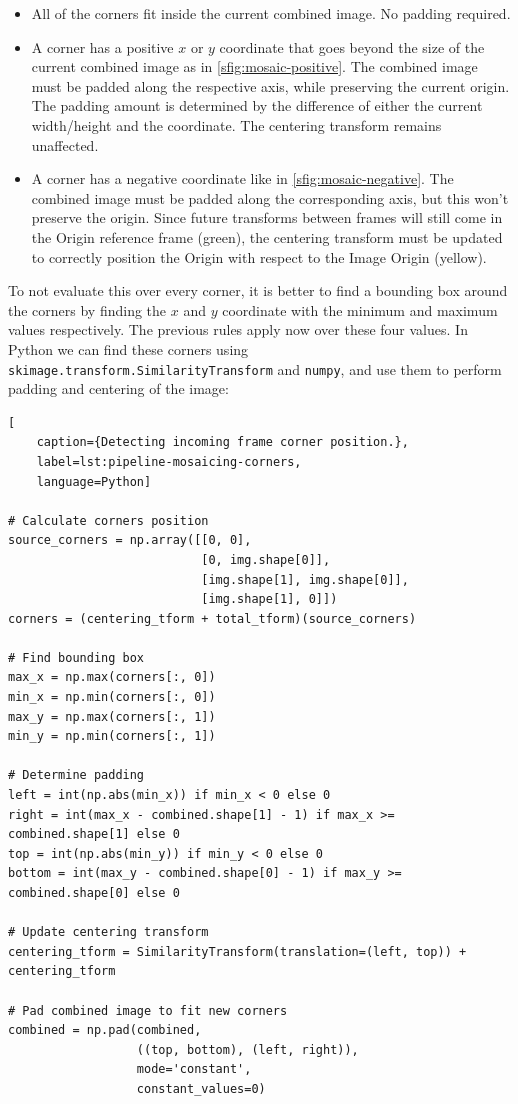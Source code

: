 \begin{itemize}
    \item All of the corners fit inside the current combined image. No padding required.
    \item A corner has a positive \(x\) or \(y\) coordinate that goes beyond the size of the current combined image as in \autoref{sfig:mosaic-positive}. The combined image must be padded along the respective axis, while preserving the current origin. The padding amount is determined by the difference of either the current width/height and the coordinate. The centering transform remains unaffected.
    \item A corner has a negative coordinate like in \autoref{sfig:mosaic-negative}. The combined image must be padded along the corresponding axis, but this won't preserve the origin. Since future transforms between frames will still come in the Origin reference frame (green), the centering transform must be updated to correctly position the Origin with respect to the Image Origin (yellow).
\end{itemize}

To not evaluate this over every corner, it is better to find a bounding box around the corners by finding the \(x\) and \(y\) coordinate with the minimum and maximum values respectively. The previous rules apply now over these four values. In Python we can find these corners using \texttt{skimage.transform.SimilarityTransform} and \texttt{numpy}, and use them to perform padding and centering of the image:

\begin{lstlisting}[
    caption={Detecting incoming frame corner position.},
    label=lst:pipeline-mosaicing-corners,
    language=Python]

# Calculate corners position
source_corners = np.array([[0, 0], 
                           [0, img.shape[0]], 
                           [img.shape[1], img.shape[0]], 
                           [img.shape[1], 0]])
corners = (centering_tform + total_tform)(source_corners)

# Find bounding box
max_x = np.max(corners[:, 0])
min_x = np.min(corners[:, 0])
max_y = np.max(corners[:, 1])
min_y = np.min(corners[:, 1])

# Determine padding
left = int(np.abs(min_x)) if min_x < 0 else 0
right = int(max_x - combined.shape[1] - 1) if max_x >= combined.shape[1] else 0
top = int(np.abs(min_y)) if min_y < 0 else 0
bottom = int(max_y - combined.shape[0] - 1) if max_y >= combined.shape[0] else 0

# Update centering transform
centering_tform = SimilarityTransform(translation=(left, top)) + centering_tform

# Pad combined image to fit new corners
combined = np.pad(combined, 
                  ((top, bottom), (left, right)), 
                  mode='constant', 
                  constant_values=0)
\end{lstlisting}

